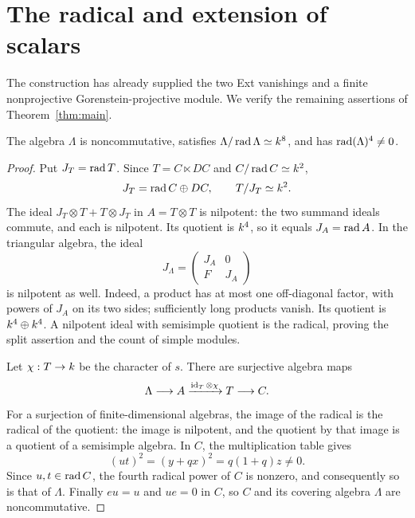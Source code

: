 \section{The radical and extension of scalars}\label{sec:consequences}

The construction has already supplied the two Ext vanishings and a
finite nonprojective Gorenstein-projective module. We verify the
remaining assertions of Theorem~\ref{thm:main}.

\begin{proposition}\label{prop:radical}
The algebra $\Lambda$ is noncommutative, satisfies
$\Lambda/\operatorname{rad}\Lambda\simeq k^8$, and has
$\operatorname{rad}(\Lambda)^4\ne0$.
\end{proposition}\nopagebreak
\begin{proof}
Put $J_T=\operatorname{rad} T$. Since $T=C\ltimes DC$ and $C/\operatorname{rad} C\simeq k^2$,
\[
 J_T=\operatorname{rad} C\oplus DC,\qquad T/J_T\simeq k^2.
\]
The ideal $J_T\otimes T+T\otimes J_T$ in $A=T\otimes T$ is nilpotent:
the two summand ideals commute, and each is nilpotent. Its quotient is
$k^4$, so it equals $J_A=\operatorname{rad} A$. In the triangular algebra, the ideal
\[
 J_\Lambda=\begin{pmatrix}J_A&0\\F&J_A\end{pmatrix}
\]
is nilpotent as well. Indeed, a product has at most one off-diagonal
factor, with powers of $J_A$ on its two sides; sufficiently long
products vanish. Its quotient is $k^4\oplus k^4$. A nilpotent ideal
with semisimple quotient is the radical, proving the split assertion
and the count of simple modules.

Let $\chi:T\to k$ be the character of $s$. There are surjective
algebra maps
\[
 \Lambda\longrightarrow A
 \xrightarrow{\operatorname{id}_T\otimes\chi}T\longrightarrow C.
\]
For a surjection of finite-dimensional algebras, the image of the
radical is the radical of the quotient: the image is nilpotent, and
the quotient by that image is a quotient of a semisimple algebra.
In $C$, the multiplication table gives
\[
 (ut)^2=(y+qx)^2=q(1+q)z\ne0.
\]
Since $u,t\in\operatorname{rad} C$, the fourth radical power of $C$ is nonzero,
and consequently so is that of $\Lambda$. Finally $eu=u$ and $ue=0$
in $C$, so $C$ and its covering algebra $\Lambda$ are noncommutative.
\end{proof}

